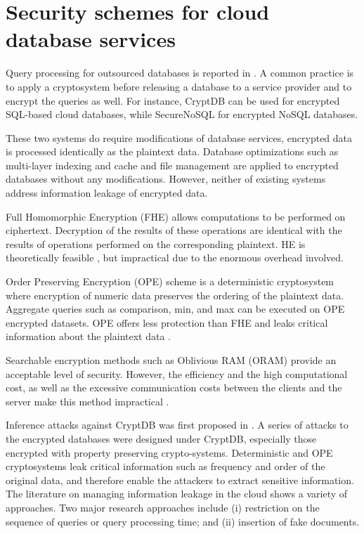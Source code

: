 \section{Security schemes for cloud database services}
\label{sec:relatedWork}

Query processing for outsourced databases is reported in  \cite{popa2011cryptdb,Ahmadian2016SecureNoSQL,7889242}. A common practice is to apply a cryptosystem  before releasing a database to a service provider and to  encrypt the queries as well. For instance, CryptDB \cite{popa2011cryptdb} can be used for encrypted SQL-based cloud databases, while SecureNoSQL  \cite{Ahmadian2016SecureNoSQL} for encrypted NoSQL databases. 

These two systems do require modifications of database services, encrypted data is processed identically as the plaintext data. Database optimizations such as multi-layer indexing and cache and file management are applied to encrypted databases without any modifications. However, neither of existing systems address information leakage of encrypted data.

Full Homomorphic Encryption (FHE)  allows computations to be performed on ciphertext. Decryption of the results of these operations are identical with the results of operations performed on the corresponding plaintext.  HE is theoretically feasible \cite{gentry2010computing}, but impractical due to the enormous overhead involved.

Order Preserving Encryption (OPE) scheme is a deterministic cryptosystem where encryption of numeric data preserves the ordering of the plaintext data. Aggregate queries such as comparison, min, and max can be executed on OPE encrypted datasets. OPE offers less protection than FHE and leaks critical information about the plaintext data \cite{ahmadian2014security, boldyreva2009order}. 

Searchable encryption methods such as Oblivious RAM (ORAM) \cite{liu2014search, ostrovsky1990efficient} provide an acceptable level of security. However, the efficiency and the high computational cost, as well as the excessive communication costs between the clients and the server make this method impractical \cite{goldreich1996software}.

Inference attacks against CryptDB was first proposed in \cite{naveed2015inference}. A series of attacks to the encrypted databases were designed under CryptDB, especially those encrypted with property preserving crypto-systems. Deterministic and OPE cryptosystems leak  critical information such as frequency and order of the original data, and therefore enable the attackers to extract sensitive information. The literature on managing information leakage in the cloud shows a variety of approaches. Two major research approaches include (i) restriction on the sequence of queries or query processing time; and (ii) insertion of fake documents.

